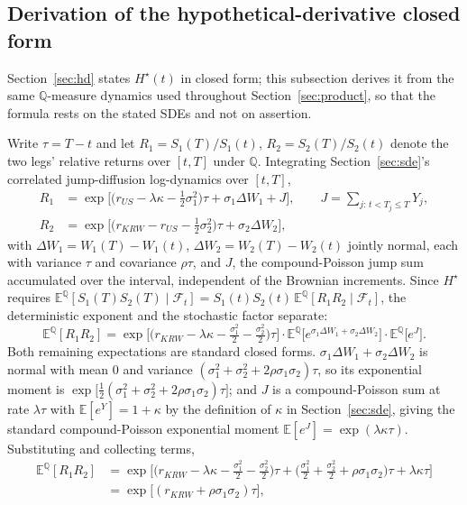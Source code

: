 \documentclass[11pt,a4paper]{article}
\begin{document}
\subsection{Derivation of the hypothetical-derivative closed form}
\label{sec:hdderiv}

Section~\ref{sec:hd} states $H^\star(t)$ in closed form; this subsection derives it from the same $\mathbb Q$-measure dynamics used throughout Section~\ref{sec:product}, so that the formula rests on the stated SDEs and not on assertion.

Write $\tau=T-t$ and let $R_1=S_1(T)/S_1(t)$, $R_2=S_2(T)/S_2(t)$ denote the two legs' relative returns over $[t,T]$ under $\mathbb Q$. Integrating Section~\ref{sec:sde}'s correlated jump-diffusion log-dynamics over $[t,T]$,
\begin{align}
R_1 &= \exp\Big[\big(r_{US}-\lambda\kappa-\tfrac12\sigma_1^2\big)\tau + \sigma_1\Delta W_1 + J\Big], \qquad J=\!\!\sum_{j:\,t<T_j\le T}\!\!Y_j, \\
R_2 &= \exp\Big[\big(r_{KRW}-r_{US}-\tfrac12\sigma_2^2\big)\tau + \sigma_2\Delta W_2\Big],
\end{align}
with $\Delta W_1=W_1(T)-W_1(t)$, $\Delta W_2=W_2(T)-W_2(t)$ jointly normal, each with variance $\tau$ and covariance $\rho\tau$, and $J$, the compound-Poisson jump sum accumulated over the interval, independent of the Brownian increments. Since $H^\star$ requires $\mathbb E^{\mathbb Q}[S_1(T)S_2(T)\mid\mathcal F_t]=S_1(t)S_2(t)\,\mathbb E^{\mathbb Q}[R_1R_2\mid\mathcal F_t]$, the deterministic exponent and the stochastic factor separate:
\begin{equation}
\mathbb E^{\mathbb Q}[R_1R_2] = \exp\!\Big[\big(r_{KRW}-\lambda\kappa-\tfrac{\sigma_1^2}2-\tfrac{\sigma_2^2}2\big)\tau\Big]\cdot \mathbb E^{\mathbb Q}\big[e^{\sigma_1\Delta W_1+\sigma_2\Delta W_2}\big]\cdot\mathbb E^{\mathbb Q}\big[e^{J}\big].
\end{equation}
Both remaining expectations are standard closed forms. $\sigma_1\Delta W_1+\sigma_2\Delta W_2$ is normal with mean $0$ and variance $(\sigma_1^2+\sigma_2^2+2\rho\sigma_1\sigma_2)\tau$, so its exponential moment is $\exp\big[\tfrac12(\sigma_1^2+\sigma_2^2+2\rho\sigma_1\sigma_2)\tau\big]$; and $J$ is a compound-Poisson sum at rate $\lambda\tau$ with $\mathbb E[e^Y]=1+\kappa$ by the definition of $\kappa$ in Section~\ref{sec:sde}, giving the standard compound-Poisson exponential moment $\mathbb E[e^J]=\exp(\lambda\kappa\tau)$. Substituting and collecting terms,
\begin{align}
\mathbb E^{\mathbb Q}[R_1R_2] &= \exp\!\Big[\big(r_{KRW}-\lambda\kappa-\tfrac{\sigma_1^2}2-\tfrac{\sigma_2^2}2\big)\tau + \big(\tfrac{\sigma_1^2}2+\tfrac{\sigma_2^2}2+\rho\sigma_1\sigma_2\big)\tau + \lambda\kappa\tau\Big] \\
&= \exp\big[(r_{KRW}+\rho\sigma_1\sigma_2)\tau\big], \label{eq:er1r2}
\end{align}
\end{document}
